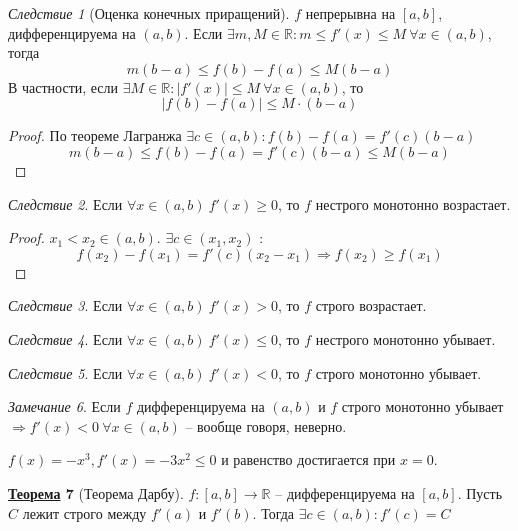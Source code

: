 \documentclass[12pt]{article}
\def\R{\mathbb{R}}       %
\def\SO{\Rightarrow}     %
\theoremstyle{definition} %
\newtheorem{Thm}{\underline{Теорема}}[subsection] %
\theoremstyle{plain} %
\theoremstyle{remark} %
\newtheorem{Cons}[Thm]{Следствие} %
\newtheorem{Rem}[Thm]{Замечание} %
\begin{document}
\begin{Cons}[Оценка конечных приращений]
    $f$ непрерывна на $[a, b]$, дифференцируема на $(a, b)$. 
    Если $\exists m, M \in \R : m \leqslant f'(x) \leqslant M \ \forall x \in (a, b)$, тогда 
    \[m(b - a) \leqslant f(b) - f(a) \leqslant M(b - a)\]
    В частности, если $\exists M \in \R : |f'(x)| \leqslant M \ \forall x \in (a, b)$, то
    \[|f(b) - f(a)| \leqslant M \cdot (b - a)\] 
\end{Cons}

\begin{proof}
    По теореме Лагранжа $\exists c \in (a, b) : f(b) - f(a) = f'(c)(b - a)$
    \[m(b - a) \leqslant f(b) - f(a) = f'(c)(b - a) \leqslant M(b - a)\] 
\end{proof}

\begin{Cons}
    Если $\forall x \in (a, b) \ f'(x) \geqslant 0$, то $f$ нестрого монотонно возрастает.
\end{Cons}

\begin{proof}
    $x_1 < x_2 \in (a, b)$. $\exists c \in (x_1, x_2)$ :
    \[f(x_2) - f(x_1) = f'(c)(x_2 - x_1) \SO f(x_2) \geqslant f(x_1)\]
\end{proof}

\begin{Cons}
    Если $\forall x \in (a, b) \ f'(x) > 0$, то $f$ строго возрастает.
\end{Cons}

\begin{Cons}
    Если $\forall x \in (a, b) \ f'(x) \leqslant 0$, то $f$ нестрого монотонно убывает.
\end{Cons}

\begin{Cons}
    Если $\forall x \in (a, b) \ f'(x) < 0$, то $f$ строго монотонно убывает.
\end{Cons}

\begin{Rem}
    Если $f$ дифференцируема на $(a, b)$ и $f$ строго монотонно убывает $\SO f'(x) < 0 \ \forall x \in (a, b)$ -- вообще говоря, неверно.

    $f(x) = -x^3, f'(x) = -3x^2 \leqslant 0$ и равенство достигается при $x = 0$.
\end{Rem}

\begin{Thm}[Теорема Дарбу]
    $f : [a, b] \to \R$ -- дифференцируема на $[a, b]$.
    Пусть $C$ лежит строго между $f'(a)$ и $f'(b)$. 
    Тогда $\exists c \in (a, b) : f'(c) = C$ 
\end{Thm}
\end{document}
